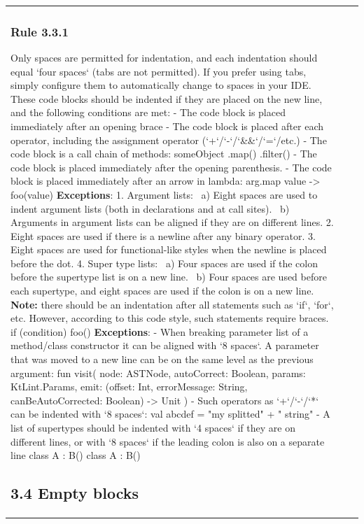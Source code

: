 \begin{center}
\begin{tabular}{ |p{}|p{}|p{}| }
\subsubsection*{\textbf{Rule 3.3.1}}
Only spaces are permitted for indentation, and each indentation should equal `four spaces` (tabs are not permitted).
If you prefer using tabs, simply configure them to automatically change to spaces in your IDE.
These code blocks should be indented if they are placed on the new line, and the following conditions are met:
-	The code block is placed immediately after an opening brace
-	The code block is placed after each operator, including the assignment operator (`+`/`-`/`\&\&`/`=`/etc.)
-	The code block is a call chain of methods:
someObject
    .map()
    .filter()
-  The code block is placed immediately after the opening parenthesis.
-  The code block is placed immediately after an arrow in lambda:
arg.map { value ->
    foo(value)
}
\textbf{Exceptions}:
1.	Argument lists: \
a) Eight spaces are used to indent argument lists (both in declarations and at call sites). \
b) Arguments in argument lists can be aligned if they are on different lines.
2.	Eight spaces are used if there is a newline after any binary operator.
3.	Eight spaces are used for functional-like styles when the newline is placed before the dot.
4.	Super type lists: \
a) Four spaces are used if the colon before the supertype list is on a new line. \
b) Four spaces are used before each supertype, and eight spaces are used if the colon is on a new line.
\textbf{Note:} there should be an indentation after all statements such as `if`, `for`, etc. However, according to this code style, such statements require braces.
if (condition)
    foo()
\textbf{Exceptions}:
- When breaking parameter list of a method/class constructor it can be aligned with `8 spaces`. A parameter that was moved to a new line can be on the same level as the previous argument:
fun visit(
        node: ASTNode,
        autoCorrect: Boolean,
        params: KtLint.Params,
        emit: (offset: Int, errorMessage: String, canBeAutoCorrected: Boolean) -> Unit
) {
}
- Such operators as `+`/`-`/`*` can be indented with `8 spaces`:
val abcdef = "my splitted" +
                " string"
- A list of supertypes should be indented with `4 spaces` if they are on different lines, or with `8 spaces` if the leading colon is also on a separate line
class A :
    B()
class A
    :
        B()
\subsection*{\textbf{3.4 Empty blocks}}

\end{tabular}
\end{center}
